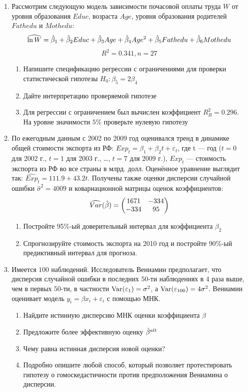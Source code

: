 \documentclass[12pt, a4paper]{article}\usepackage[]{graphicx}\usepackage[]{color}
\begin{document}
\begin{enumerate}

\item  Рассмотрим следующую модель зависимости почасовой оплаты труда $W$ от уровня образования $Educ$, возраста $Age$, уровня образования родителей $Fathedu$ и $Mothedu$:
\[
\widehat{\ln W} = \hat{\beta}_1 + \hat{\beta}_2 Educ + \hat{\beta}_3 Age + \hat{\beta}_4 Age^2+ \hat{\beta}_5 Fathedu + \hat{\beta}_6 Mothedu
\]
\[
R^2 = 0.341, n = 27
\]
\begin{enumerate}
\item Напишите спецификацию регрессии с ограничениями для проверки статистической гипотезы $H_0: \beta_5 = 2\beta_4$
\item Дайте интерпретацию проверяемой гипотезе
\item Для регрессии с ограничением был вычислен коэффициент $R_{R}^2 = 0.296$. На уровне значимости $5\%$ проверьте нулевую гипотезу
\end{enumerate}



\item По ежегодным данным с 2002 по 2009 год оценивался тренд в динамике общей стоимости экспорта из РФ: $Exp_t=\beta_1+\beta_2t+\varepsilon_t$, где t — год ($t=0$ для 2002 г., $t=1$ для 2003 г., \ldots, $t=7$
для 2009 г.), $Exp_t$ — стоимость экспорта из РФ во все страны в млрд. долл. Оценённое уравнение  выглядит так: $\widehat{Exp}_t=111.9+43.2t$. Получены также оценки дисперсии случайной ошибки $\hat{\sigma}^2=4009$ и ковариационной матрицы оценок коэффициентов:
\[
\widehat{Var}(\hat{\beta})=\begin{pmatrix}
1671 & -334 \\
-334 & 95
\end{pmatrix}
\]

\begin{enumerate}
\item Постройте 95\%-ый доверительный интервал для коэффициента $\beta_2$
\item Спрогнозируйте стоимость экспорта на 2010 год и постройте 90\%-ый предиктивный интервал для прогноза.
\end{enumerate}
\item Имеется $100$ наблюдений. Исследователь Вениамин предполагает, что дисперсия случайной ошибки в последних $50$-ти наблюдениях в 4 раза выше, чем в первых $50$-ти, в частности $\operatorname{Var}(\varepsilon_1)=\sigma^2$, а $\operatorname{Var}(\varepsilon_{100})=4\sigma^2$. Вениамин оценивает модель $y_i=\beta x_i +\varepsilon_i$ с помощью МНК.
\begin{enumerate}
\item Найдите истинную дисперсию МНК оценки коэффициента $\beta$
\item Предложите более эффективную оценку $\hat{\beta}^{alt}$
\item Чему равна истинная дисперсия новой оценки?
\item Подробно опишите любой способ, который позволяет протестировать гипотезу о гомоскедастичности против предположения Вениамина о дисперсии.
\end{enumerate}


\end{enumerate}
\end{document}

